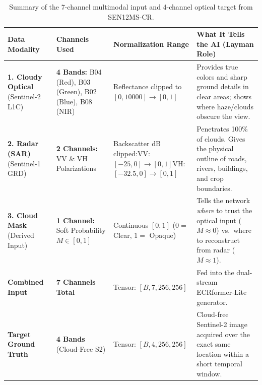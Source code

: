 \documentclass[11pt,a4paper]{article}
\begin{document}
\begin{table}[h!]
\centering
\small
\renewcommand{\arraystretch}{1.25}
\begin{tabular}{p{3.2cm} p{2.5cm} p{3.2cm} p{5.5cm}}
\toprule
\textbf{Data Modality} & \textbf{Channels Used} & \textbf{Normalization Range} & \textbf{What It Tells the AI (Layman Role)} \\
\midrule
\textbf{1. Cloudy Optical} \newline (Sentinel-2 L1C) & \textbf{4 Bands:} \newline B04 (Red), B03 (Green), B02 (Blue), B08 (NIR) & Reflectance clipped to $[0, 10000] \rightarrow [0, 1]$ & Provides true colors and sharp ground details in clear areas; shows where haze/clouds obscure the view. \\
\addlinespace[2pt]
\textbf{2. Radar (SAR)} \newline (Sentinel-1 GRD) & \textbf{2 Channels:} \newline VV \& VH Polarizations & Backscatter dB clipped:\newline VV: $[-25, 0] \rightarrow [0, 1]$\newline VH: $[-32.5, 0] \rightarrow [0, 1]$ & Penetrates 100\% of clouds. Gives the physical outline of roads, rivers, buildings, and crop boundaries. \\
\addlinespace[2pt]
\textbf{3. Cloud Mask} \newline (Derived Input) & \textbf{1 Channel:} \newline Soft Probability $M \in [0,1]$ & Continuous $[0, 1]$ \newline ($0=$ Clear, $1=$ Opaque) & Tells the network \textit{where} to trust the optical input ($M \approx 0$) vs.\ where to reconstruct from radar ($M \approx 1$). \\
\midrule
\textbf{Combined Input} & \textbf{7 Channels Total} & Tensor: $[B, 7, 256, 256]$ & Fed into the dual-stream ECRformer-Lite generator. \\
\addlinespace[2pt]
\textbf{Target Ground Truth} & \textbf{4 Bands} (Cloud-Free S2) & Tensor: $[B, 4, 256, 256]$ & Cloud-free Sentinel-2 image acquired over the exact same location within a short temporal window. \\
\bottomrule
\end{tabular}
\caption{Summary of the 7-channel multimodal input and 4-channel optical target from SEN12MS-CR.}
\end{table}

\end{document}
